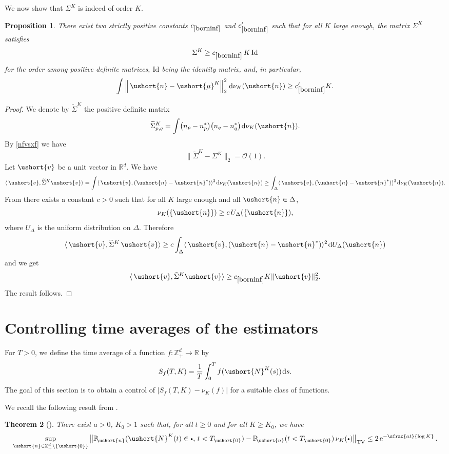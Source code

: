 \documentclass[10pt]{amsart}
\newcommand{\sbullet}{{\scriptscriptstyle\bullet}}
\newcommand{\csbullet}{{\raisebox{1pt}{$\sbullet$}}}
\let\backslash\setminus
\let\mathcal\mathscr
\numberwithin{equation}{section}
\theoremstyle{plain}
\newtheorem{theorem}{Theorem}[section]
\newtheorem{proposition}[theorem]{Proposition}
\theoremstyle{definition}
\newcommand{\pcte}[1]{c_{\eqref{#1}}}
\newcommand{\proba}{{\mathbb{P}}}
\newcommand{\real}{\mathbb{R}}
\newcommand{\zentiers}{{\mathbb{Z}}}
\newcommand{\domaine}{\zentiers_{+}^{d}}
\newcommand{\sdomaine}{{\zentiers}_+^d}
\newcommand{\Oun}{\mathcal{O}(1)}
\newcommand{\sK}{K}
\newcommand{\vecn}{\ushort{n}}
\newcommand{\vecnf}{\ushort{n}^*}
\newcommand{\vecv}{\ushort{v}}
\newcommand{\vmu}{\ushort{\mu}}
\newcommand{\veczer}{\ushort{0}}
\newcommand{\sDelta}{\Delta}
\newcommand{\leproc}{\ushort{N}^{K}}
\newcommand{\nuk}{\nu_{K}}\let\snuk\nuk
\newcommand{\e}{\operatorname{e}}
\newcommand{\dd}{\hspace{1pt}\mathrm{d}}
\begin{document}
We now show that $\Sigma^{\sK}$ is indeed of order $K$.
\begin{proposition}\label{borninf}
There exist two strictly positive constants $\pcte{borninf}$ and $\pcte{borninf}'$ such that for all $K$ large enough, the matrix $\Sigma^{\sK}$ satisfies
\[
\Sigma^{\sK}\ge \pcte{borninf} \, K \, \mathrm{Id}
\]
for the order among positive definite matrices, $\mathrm{Id}$ being the identity matrix, and, in particular,
\[
\int \left\|\,\vecn-\vmu^{\sK}\right\|_{2}^2\dd\nuk(\vecn)
\geq \pcte{borninf}' K.
\]
\end{proposition}
\begin{proof}
We denote by $\widetilde\Sigma^{\sK}$ the positive definite matrix
\[
\widetilde\Sigma^{\sK}_{p,q}= \int \bigl(n_{p}-n_{p}^*\bigr)
\bigl(n_{q}-n_{q}^*\bigr)\dd\nuk(\vecn).
\]
By \eqref{nfvsxf} we have
\begin{equation}\label{comparaisondescov}
\big\|\widetilde\Sigma^{\sK}-\Sigma^{\sK}\big\|_{2}=\Oun.
\end{equation}
Let $\vecv$ be a unit vector in $\real^{d}$. We have
\[
\langle\, \vecv,\widetilde\Sigma^{\sK}\vecv\rangle=
\int \langle\, \vecv,(\vecn-\vecnf)\rangle^2\dd\nuk(\vecn)\ge
\int_{\sDelta}\langle\, \vecv,(\vecn-\vecnf)\rangle^2\dd\nuk(\vecn).
\]
From \cite[Lem.\,5.3]{ccm2} there exists a constant $c>0$ such that for all $K$ large enough and all $\vecn\in \Delta$,
\[
{\nuk}(\{\vecn\})\geq c\, U_{\Delta}(\{\vecn\}),
\]
where $U_{\Delta}$ is the uniform distribution on $\Delta$.
Therefore
\[
\langle\, \vecv, \widetilde\Sigma^{\sK}\,\vecv\rangle\ge
c \int_{\Delta} \langle\, \vecv,(\vecn-\vecnf)\rangle^2
\dd U_{\Delta}(\vecn)
\]
and we get
\[
\langle\, \vecv,\tilde\Sigma^{\sK}\vecv\rangle\geq \pcte{borninf} K\|\vecv\|_{2}^2.
\]
The result follows.
\end{proof}

\section{Controlling time averages of the estimators}
\label{sec:process}

For $T>0$, we define the time average of a function $f:\domaine\to\real$ by
\begin{equation}
\label{statf}
S_{f}(T,K)=\frac{1}{T}\int_{0}^{T}f(\leproc(s)) \dd s.
\end{equation}
The goal of this section is to obtain a control of $|S_{f}(T,K)-\nuk(f)|$ for a suitable class of functions.

We recall the following result from \cite[Th.\,3.1]{ccm2}.
\begin{theorem}[\cite{ccm2}]\label{decor-thm}
There exist $a>0$, $K_0>1$ such that, for all
$t\geq 0$ and for all $K\geq K_0$, we have
\begin{equation}\label{decor}
\sup_{\vecn\in\sdomaine\backslash\{\veczer\}}
\big\| \proba\!_{\vecn}(\leproc(t)\in \csbullet ,\, t< T_{\veczer}) -\proba\!_{\vecn}(t< T_{\veczer})
\,\nuk(\csbullet)\big\|_{{ \mathrm{TV}}} \leq 2\e^{-\sfrac{at}{\log K}}.
\end{equation}
\end{theorem}
\end{document}
